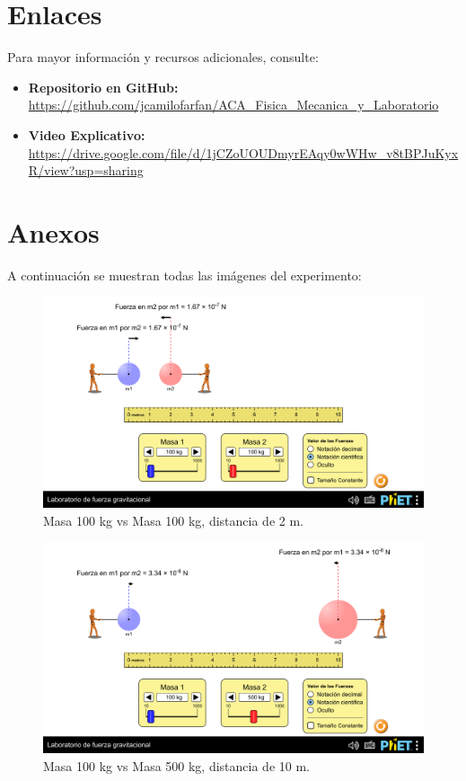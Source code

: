 \documentclass[a4paper,12pt]{article}
\begin{document}
\newpage
\section*{Enlaces}
Para mayor información y recursos adicionales, consulte:
\begin{itemize}
    \item \textbf{Repositorio en GitHub:} \url{https://github.com/jcamilofarfan/ACA_Fisica_Mecanica_y_Laboratorio}
    \item \textbf{Video Explicativo:} \url{https://drive.google.com/file/d/1jCZoUOUDmyrEAqy0wWHw_v8tBPJuKyxR/view?usp=sharing}
\end{itemize}

\newpage
\section{Anexos}
A continuación se muestran todas las imágenes del experimento:

\begin{figure}[h]
    \centering
    \includegraphics[width=1\linewidth]{m1_100_m2_100_r_2.png}
    \caption{Masa 100 kg vs Masa 100 kg, distancia de 2 m.}
\end{figure}

\begin{figure}[h]
    \centering
    \includegraphics[width=1\linewidth]{m1_100_m2_500_r_10.png}
    \caption{Masa 100 kg vs Masa 500 kg, distancia de 10 m.}
\end{figure}
\end{document}
